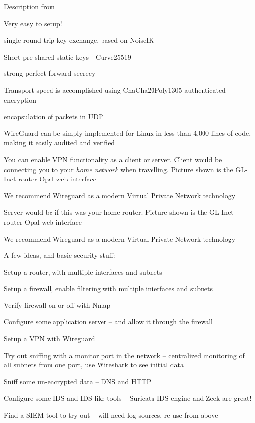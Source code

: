 \documentclass[Screen16to9,17pt]{foils}
\begin{document}
Description from 

\begin{list2}
\item Very easy to setup!
\item single round trip key exchange, based on NoiseIK
\item Short pre-shared static keys—Curve25519
\item strong perfect forward secrecy
\item Transport
speed is accomplished using ChaCha20Poly1305 authenticated-encryption
\item encapsulation of packets in UDP
\item WireGuard can be
simply implemented for Linux in less than 4,000 lines of code, making it easily audited and verified
\end{list2}





You can enable VPN functionality as a client or server. Client would be connecting you to your \emph{home network} when travelling. Picture shown is the GL-Inet router Opal web interface

We recommend Wireguard as a modern Virtual Private Network technology



Server would be if this was your home router.  Picture shown is the GL-Inet router Opal web interface

We recommend Wireguard as a modern Virtual Private Network technology




A few ideas, and basic security stuff:
\begin{list2}
\item Setup a router, with multiple interfaces and subnets
\item Setup a firewall, enable filtering with multiple interfaces and subnets
\item Verify firewall on or off with Nmap
\item Configure some application server -- and allow it through the firewall
\item Setup a VPN with Wireguard
\item Try out sniffing with a monitor port in the network -- centralized monitoring of all subnets from one port, use Wireshark to see initial data
\item Sniff some un-encrypted data -- DNS and HTTP
\item Configure some IDS and IDS-like tools -- Suricata IDS engine and Zeek are great!
\item Find a SIEM tool to try out -- will need log sources, re-use from above
\end{list2}
\end{document}
